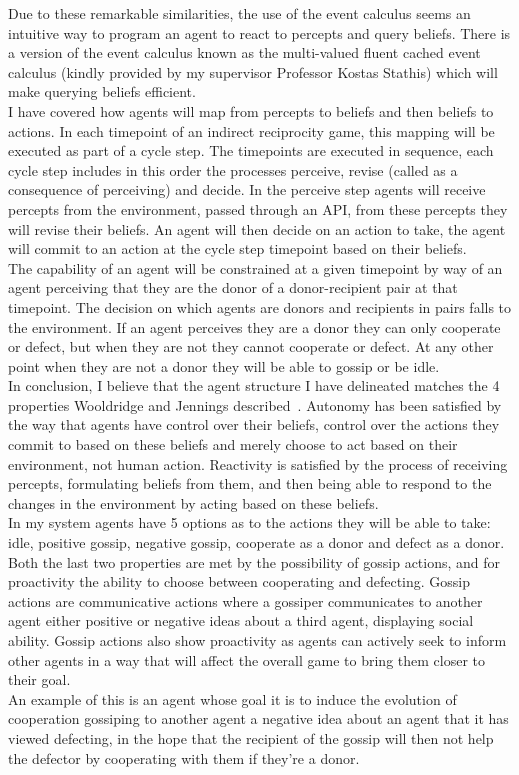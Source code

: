 \documentclass[twoside,twocolumn]{article}
\begin{document}
Due to these remarkable similarities, the use of the event calculus seems an intuitive way to program an agent to react to percepts and query beliefs. There is a version of the event calculus known as the multi-valued fluent cached event calculus (kindly provided by my supervisor Professor Kostas Stathis) which will make querying beliefs efficient.\\
I have covered how agents will map from percepts to beliefs and then beliefs to actions. In each timepoint of an indirect reciprocity game, this mapping will be executed as part of a cycle step. The timepoints are executed in sequence, each cycle step includes in this order the processes perceive, revise (called as a consequence of perceiving) and decide. In the perceive step agents will receive percepts from the environment, passed through an API, from these percepts they will revise their beliefs. An agent will then decide on an action to take, the agent will commit to an action at the cycle step timepoint based on their beliefs.\\
The capability of an agent will be constrained at a given timepoint by way of an agent perceiving that they are the donor of a donor-recipient pair at that timepoint. The decision on which agents are donors and recipients in pairs falls to the environment. If an agent perceives they are a donor they can only cooperate or defect, but when they are not they cannot cooperate or defect. At any other point when they are not a donor they will be able to gossip or be idle.\\
In conclusion, I believe that the agent structure I have delineated matches the 4 properties Wooldridge and Jennings described~\cite{wooldridge_jennings_1995}. Autonomy has been satisfied by the way that agents have control over their beliefs, control over the actions they commit to based on these beliefs and merely choose to act based on their environment, not human action. Reactivity is satisfied by the process of receiving percepts, formulating beliefs from them, and then being able to respond to the changes in the environment by acting based on these beliefs.\\
In my system agents have 5 options as to the actions they will be able to take: idle, positive gossip, negative gossip, cooperate as a donor and defect as a donor. Both the last two properties are met by the possibility of gossip actions, and for proactivity the ability to choose between cooperating and defecting. Gossip actions are communicative actions where a gossiper communicates to another agent either positive or negative ideas about a third agent, displaying social ability. Gossip actions also show proactivity as agents can actively seek to inform other agents in a way that will affect the overall game to bring them closer to their goal.\\
An example of this is an agent whose goal it is to induce the evolution of cooperation gossiping to another agent a negative idea about an agent that it has viewed defecting, in the hope that the recipient of the gossip will then not help the defector by cooperating with them if they're a donor.
\end{document}
